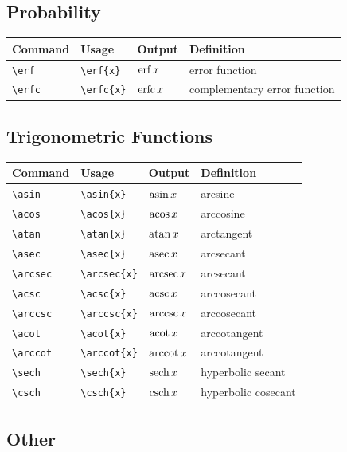 \documentclass[11pt]{article}
\begin{document}
\subsection{Probability}

\begin{tabular}{llll}
    Command      & Usage           & Output     & Definition                   \\
    \hline
    \verb|\erf|  & \verb|\erf{x}|  & $\operatorname{erf}{x}$  & error function               \\
    \verb|\erfc| & \verb|\erfc{x}| & $\operatorname{erfc}{x}$ & complementary error function \\
\end{tabular}

\subsection{Trigonometric Functions}

\begin{tabular}{llll}
    Command        & Usage             & Output       & Definition          \\
    \hline
    \verb|\asin|   & \verb|\asin{x}|   & $\operatorname{asin}{x}$   & arcsine             \\
    \verb|\acos|   & \verb|\acos{x}|   & $\operatorname{acos}{x}$   & arccosine           \\
    \verb|\atan|   & \verb|\atan{x}|   & $\operatorname{atan}{x}$   & arctangent          \\
    \verb|\asec|   & \verb|\asec{x}|   & $\operatorname{asec}{x}$   & arcsecant           \\
    \verb|\arcsec| & \verb|\arcsec{x}| & $\operatorname{arcsec}{x}$ & arcsecant           \\
    \verb|\acsc|   & \verb|\acsc{x}|   & $\operatorname{acsc}{x}$   & arccosecant         \\
    \verb|\arccsc| & \verb|\arccsc{x}| & $\operatorname{arccsc}{x}$ & arccosecant         \\
    \verb|\acot|   & \verb|\acot{x}|   & $\operatorname{acot}{x}$   & arccotangent        \\
    \verb|\arccot| & \verb|\arccot{x}| & $\operatorname{arccot}{x}$ & arccotangent        \\
    \verb|\sech|   & \verb|\sech{x}|   & $\operatorname{sech}{x}$   & hyperbolic secant   \\
    \verb|\csch|   & \verb|\csch{x}|   & $\operatorname{csch}{x}$   & hyperbolic cosecant \\
\end{tabular}

\subsection{Other}
\end{document}

